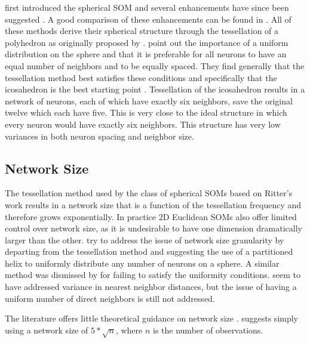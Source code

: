 \documentclass[11pt]{article}
\begin{document}
\cite{ritter99} first introduced the spherical SOM and several enhancements have
since been suggested \citep{boudjemai2003,sangole03,Nishio:2006fk,wu2006}.  A
good comparison of these enhancements can be found in \citep{wu2006}.  All of
these methods derive their spherical structure through the tessellation of a
polyhedron as originally proposed by \citeauthor{ritter99}.  \cite{wu2006} point
out the importance of a uniform distribution on the sphere and that it is
preferable for all neurons to have an equal number of neighbors and to be
equally spaced.  They find generally that the tessellation method best satisfies
these conditions and specifically that the icosahedron is the best starting
point \citep{wu2005}. Tessellation of the icosahedron results in a network of
neurons, each of which have exactly six neighbors, save the original twelve
which each have five.  This is very close to the ideal structure in which every
neuron would have exactly six neighbors.  This structure has very low variances
in both neuron spacing and neighbor size.

\subsection{Network Size}
The tessellation method used by the class of spherical SOMs based on Ritter's
work results in a network size that is a function of the tessellation frequency
and therefore grows exponentially. In practice 2D Euclidean SOMs also offer
limited control over network size, as it is undesirable to have one dimension
dramatically larger than the other.  \cite{Nishio:2006fk} try to address the
issue of network size granularity by departing from the tessellation method and
suggesting the use of a partitioned helix to uniformly distribute any number of
neurons on a sphere.  A similar method was dismissed by \cite{wu2005} for
failing to satisfy the uniformity conditions.  \citeauthor{Nishio:2006fk} seem
to have addressed variance in nearest neighbor distances, but the issue of
having a uniform number of direct neighbors is still not addressed.

The literature offers little theoretical guidance on network size
\citep{cho1996}.  \cite{toolbox} suggests simply using a network size of
\(5*\sqrt {n}\), where \(n\) is the number of observations.
\end{document}

